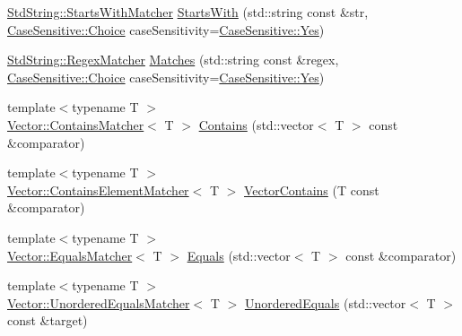 \begin{DoxyCompactItemize}
\item 
\mbox{\hyperlink{struct_catch_1_1_matchers_1_1_std_string_1_1_starts_with_matcher}{Std\+String\+::\+Starts\+With\+Matcher}} \mbox{\hyperlink{namespace_catch_1_1_matchers_a97c9ee09a70378ca7e8c6f9f01b0d6d1}{Starts\+With}} (std\+::string const \&str, \mbox{\hyperlink{struct_catch_1_1_case_sensitive_aad49d3aee2d97066642fffa919685c6a}{Case\+Sensitive\+::\+Choice}} case\+Sensitivity=\mbox{\hyperlink{struct_catch_1_1_case_sensitive_aad49d3aee2d97066642fffa919685c6aa7c5550b69ec3c502e6f609b67f9613c6}{Case\+Sensitive\+::\+Yes}})
\item 
\mbox{\hyperlink{struct_catch_1_1_matchers_1_1_std_string_1_1_regex_matcher}{Std\+String\+::\+Regex\+Matcher}} \mbox{\hyperlink{namespace_catch_1_1_matchers_a82f1893cf50ae4c14b9b3e0980bf22b8}{Matches}} (std\+::string const \&regex, \mbox{\hyperlink{struct_catch_1_1_case_sensitive_aad49d3aee2d97066642fffa919685c6a}{Case\+Sensitive\+::\+Choice}} case\+Sensitivity=\mbox{\hyperlink{struct_catch_1_1_case_sensitive_aad49d3aee2d97066642fffa919685c6aa7c5550b69ec3c502e6f609b67f9613c6}{Case\+Sensitive\+::\+Yes}})
\item 
{\footnotesize template$<$typename T $>$ }\\\mbox{\hyperlink{struct_catch_1_1_matchers_1_1_vector_1_1_contains_matcher}{Vector\+::\+Contains\+Matcher}}$<$ T $>$ \mbox{\hyperlink{namespace_catch_1_1_matchers_a4b3621740dc515216ad31ab827d4092c}{Contains}} (std\+::vector$<$ T $>$ const \&comparator)
\item 
{\footnotesize template$<$typename T $>$ }\\\mbox{\hyperlink{struct_catch_1_1_matchers_1_1_vector_1_1_contains_element_matcher}{Vector\+::\+Contains\+Element\+Matcher}}$<$ T $>$ \mbox{\hyperlink{namespace_catch_1_1_matchers_ae8db5846328116fb36386893deaec944}{Vector\+Contains}} (T const \&comparator)
\item 
{\footnotesize template$<$typename T $>$ }\\\mbox{\hyperlink{struct_catch_1_1_matchers_1_1_vector_1_1_equals_matcher}{Vector\+::\+Equals\+Matcher}}$<$ T $>$ \mbox{\hyperlink{namespace_catch_1_1_matchers_a332a401fb0da33c988e9cfa400ecce1b}{Equals}} (std\+::vector$<$ T $>$ const \&comparator)
\item 
{\footnotesize template$<$typename T $>$ }\\\mbox{\hyperlink{struct_catch_1_1_matchers_1_1_vector_1_1_unordered_equals_matcher}{Vector\+::\+Unordered\+Equals\+Matcher}}$<$ T $>$ \mbox{\hyperlink{namespace_catch_1_1_matchers_a3eced3a4f580478f4c5e67ed7e2915df}{Unordered\+Equals}} (std\+::vector$<$ T $>$ const \&target)
\end{DoxyCompactItemize}


